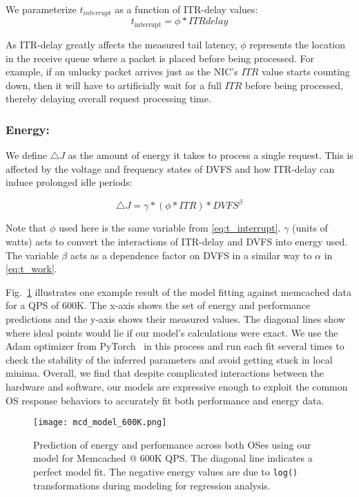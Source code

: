 We parameterize $t_{interrupt}$ as a function of ITR-delay values:
\begin{equation} \label{eq:t_interrupt}
    t_{\text{interrupt}} = \phi * ITRdelay
\end{equation}

As ITR-delay greatly affects the measured tail latency, $\phi$ represents the location in the receive queue where a packet is placed before being processed. For example, if an unlucky packet arrives just as the NIC's $ITR$ value starts counting down, then it will have to artificially wait for a full $ITR$ before being processed, thereby delaying overall request processing time. 

\subsubsection{Energy:} We define $\triangle J$ as the amount of energy it takes to process a single request. This is affected by the voltage and frequency states of DVFS and how ITR-delay can induce prolonged idle periods: 

\begin{equation} \label{eq:open_energy}
\triangle J = \gamma*(\phi*ITR)*DVFS^\beta 
\end{equation}

Note that $\phi$ used here is the same variable from \cref{eq:t_interrupt}. $\gamma$ (units of watts) acts to convert the interactions of ITR-delay and DVFS into energy used. The variable $\beta$ acts as a dependence factor on DVFS in a similar way to $\alpha$ in \cref{eq:t_work}.

Fig.~\ref{fig:mcd_model_600K} illustrates one example result of the model fitting against memcached data for a QPS of 600K. The x-axis shows the set of energy and performance predictions and the y-axis shows their measured values. The diagonal lines show where ideal points would lie if our model's calculations were exact. We use the Adam optimizer from PyTorch~\cite{pytorchadam} in this process and run each fit several times to check the stability of the inferred parameters and avoid getting stuck in local minima. Overall, we find that despite complicated interactions between the hardware and software, our models are expressive enough to exploit the common OS response behaviors to accurately fit both performance and energy data. 

\begin{figure}
\centering
    \texttt{[image: mcd\_model\_600K.png]}
    \caption{\small Prediction of energy and performance across both OSes using our model for Memcached @ 600K QPS. The diagonal line indicates a perfect model fit. The negative energy values are due to \texttt{log()} transformations during modeling for regression analysis.}
    \label{fig:mcd_model_600K}
    \vspace{-0.2in}
\end{figure}

